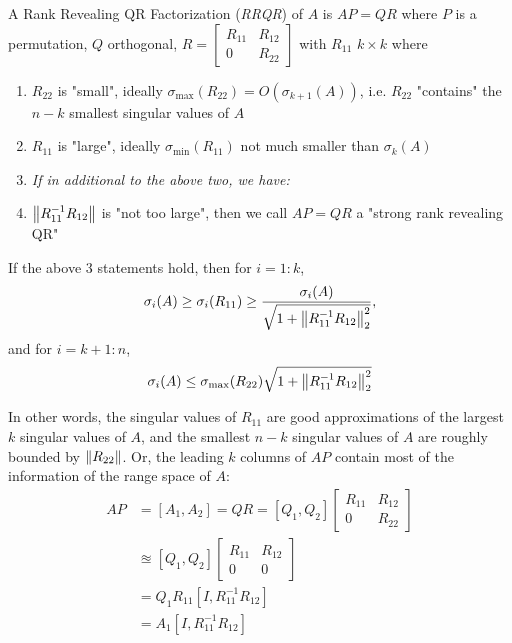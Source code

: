 \documentclass[11pt]{article}
\numberwithin{equation}{section}
\begin{document}
\begin{definition}
    A Rank Revealing QR Factorization (\textit{RRQR}) of $A$ is $AP = QR$ where $P$ is a permutation, $Q$ orthogonal, $R=\left[\begin{array}{ll}
        R_{11} & R_{12} \\
        0 & R_{22}
        \end{array}\right]$ with $R_{11}$ $k \times k$ where \begin{enumerate}
            \item $R_{22}$ is "small", ideally $\sigma_{\mathrm{max}}(R_{22}) = O(\sigma_{k+1}(A))$, i.e. $R_{22}$ "contains" the $n-k$ smallest singular values of $A$
            \item $R_{11}$ is "large", ideally $\sigma_{\mathrm{min}}(R_{11})$ not much smaller than $\sigma_{k}(A)$
            \item[] \textit{If in additional to the above two, we have:}
            \item $\left\| R_{11}^{-1}R_{12} \right\|$ is "not too large", then we call $AP = QR$ a "strong rank revealing QR"
        \end{enumerate}
\end{definition}

\begin{theorem}
    If the above 3 statements hold, then for $i=1:k$, \begin{align*}
        \sigma_{i}(A) \geq \sigma_{i}(R_{11}) \geq \frac{\sigma_{i}(A)}{\sqrt{1 + \left\| R_{11}^{-1}R_{12} \right\|_2^2}},
    \end{align*}
    and for $i=k+1:n$, \begin{align*}
        \sigma_{i}(A) \leq \sigma_{\mathrm{max}}(R_{22}) \sqrt{1 + \left\| R_{11}^{-1}R_{12} \right\|_2^2}
    \end{align*}
\end{theorem}

In other words, the singular values of $R_{11}$ are good approximations of the largest $k$ singular values of $A$, 
and the smallest $n-k$ singular values of $A$ are roughly bounded by $\left\| R_{22} \right\|$. Or, the leading $k$ columns of $AP$
contain most of the information of the range space of $A$: \begin{align*}
    AP &= \left[ A_1, A_2 \right] = QR = \left[ Q_1, Q_2 \right]\left[\begin{array}{ll}
        R_{11} & R_{12} \\
        0 & R_{22}
        \end{array}\right] \\
    &\approxeq \left[ Q_1, Q_2 \right]\left[\begin{array}{ll}
        R_{11} & R_{12} \\
        0 & 0
        \end{array}\right] \\
    &= Q_1 R_{11} \left[ I, R_{11}^{-1}R_{12} \right] \\
    &= A_1  \left[ I, R_{11}^{-1}R_{12} \right]
\end{align*}
\end{document}
